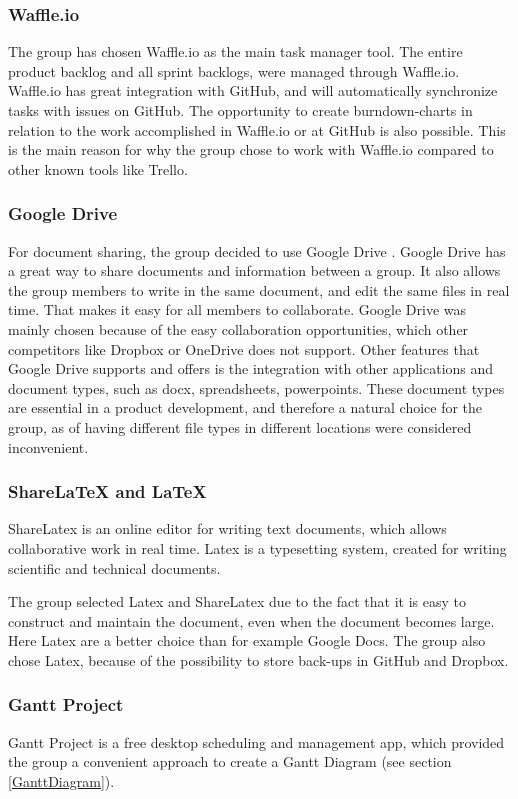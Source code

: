 \subsubsection{Waffle.io}
\label{Waffle.io}
The group has chosen Waffle.io \cite{Waffle} as the main task manager tool. The entire product backlog and all sprint backlogs, were managed through Waffle.io. Waffle.io has great integration with GitHub, and will automatically synchronize tasks with issues on GitHub. The opportunity to create burndown-charts in relation to the work accomplished in Waffle.io or at GitHub is also possible. This is the main reason for why the group chose to work with Waffle.io compared to other known tools like Trello.

\subsubsection{Google Drive}
For document sharing, the group decided to use Google Drive \cite{GoogleDrive}. Google Drive has a great way to share documents and information between a group. It also allows the group members to write in the same document, and edit the same files in real time. That makes it easy for all members to collaborate. Google Drive was mainly chosen because of the easy collaboration opportunities, which other competitors like Dropbox or OneDrive does not support. Other features that Google Drive supports and offers is the integration with other applications and document types, such as docx, spreadsheets, powerpoints. These document types are essential in a product development, and therefore a natural choice for the group, as of having different file types in different locations were considered inconvenient.

\subsubsection{ShareLaTeX and LaTeX}
ShareLatex \cite{ShareLatex} is an online editor for writing text documents, which allows collaborative work in real time. Latex is a typesetting system, created for writing scientific and technical documents.

The group selected Latex and ShareLatex due to the fact that it is easy to construct and maintain the document, even when the document becomes large. Here Latex are a better choice than for example Google Docs. The group also chose Latex, because of the possibility to store back-ups in GitHub and Dropbox.

\subsubsection{Gantt Project} \label{sss:Gant_Project} 
Gantt Project \cite{Gantt} is a free desktop scheduling and management app, which provided the group a convenient approach to create a Gantt Diagram (see section \ref{GanttDiagram}). 


